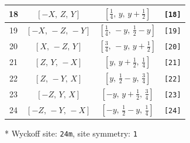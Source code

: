 \documentclass[fleqn,8pt]{jsarticle}
\begin{document}
\begin{longtable}{cccc}
18 & $\left[ - X,\, Z,\, Y \right]$ & $\left[ \frac{1}{4},\, y,\, y + \frac{1}{2} \right]$ & {\tt [18]} \\ \hline
19 & $\left[ - X,\, - Z,\, - Y \right]$ & $\left[ \frac{1}{4},\, - y,\, \frac{1}{2} - y \right]$ & {\tt [19]} \\ \hline
20 & $\left[ X,\, - Z,\, Y \right]$ & $\left[ \frac{3}{4},\, - y,\, y + \frac{1}{2} \right]$ & {\tt [20]} \\ \hline
21 & $\left[ Z,\, Y,\, - X \right]$ & $\left[ y,\, y + \frac{1}{2},\, \frac{1}{4} \right]$ & {\tt [21]} \\ \hline
22 & $\left[ Z,\, - Y,\, X \right]$ & $\left[ y,\, \frac{1}{2} - y,\, \frac{3}{4} \right]$ & {\tt [22]} \\ \hline
23 & $\left[ - Z,\, Y,\, X \right]$ & $\left[ - y,\, y + \frac{1}{2},\, \frac{3}{4} \right]$ & {\tt [23]} \\ \hline
24 & $\left[ - Z,\, - Y,\, - X \right]$ & $\left[ - y,\, \frac{1}{2} - y,\, \frac{1}{4} \right]$ & {\tt [24]} \\
\end{longtable}
* Wyckoff site: {\tt 24m}, site symmetry: {\tt 1}
\renewcommand{\arraystretch}{1.2}
\end{document}

